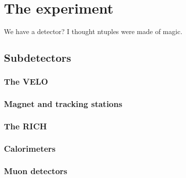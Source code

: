

\chapter{The \lhcb experiment}
\label{ch:3-detector}


We have a detector? I thought ntuples were made of magic.

\section{Subdetectors} %
\label{sec:subdetectors}

\subsection{The VELO} %
\label{sub:the_velo}


\subsection{Magnet and tracking stations} %
\label{sub:magnet_and_tracking_stations}


\subsection{The RICH} %
\label{sub:the_rich}


\subsection{Calorimeters} %
\label{sub:calorimeters}


\subsection{Muon detectors} %
\label{sub:muon_detectors}

